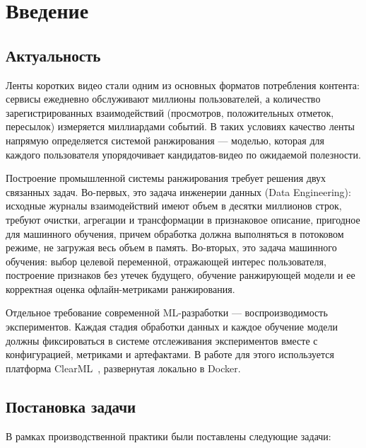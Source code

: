 \section{Введение}

\subsection{Актуальность}

Ленты коротких видео стали одним из основных форматов потребления контента: сервисы ежедневно обслуживают миллионы пользователей, а количество зарегистрированных взаимодействий (просмотров, положительных отметок, пересылок) измеряется миллиардами событий.
В таких условиях качество ленты напрямую определяется системой ранжирования --- моделью, которая для каждого пользователя упорядочивает кандидатов-видео по ожидаемой полезности.

Построение промышленной системы ранжирования требует решения двух связанных задач.
Во-первых, это задача инженерии данных (Data Engineering): исходные журналы взаимодействий имеют объем в десятки миллионов строк, требуют очистки, агрегации и трансформации в признаковое описание, пригодное для машинного обучения, причем обработка должна выполняться в потоковом режиме, не загружая весь объем в память.
Во-вторых, это задача машинного обучения: выбор целевой переменной, отражающей интерес пользователя, построение признаков без утечек будущего, обучение ранжирующей модели и ее корректная оценка офлайн-метриками ранжирования.

Отдельное требование современной ML-разработки --- воспроизводимость экспериментов.
Каждая стадия обработки данных и каждое обучение модели должны фиксироваться в системе отслеживания экспериментов вместе с конфигурацией, метриками и артефактами.
В работе для этого используется платформа ClearML~\cite{clearml-docs}, развернутая локально в Docker.

\subsection{Постановка задачи}

В рамках производственной практики были поставлены следующие задачи:

